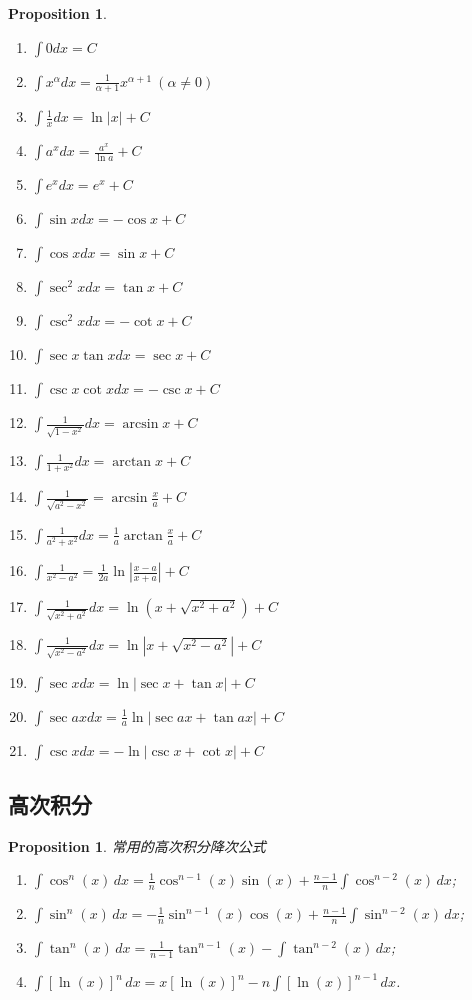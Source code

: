 \documentclass{article}
\newtheorem{proposition}[theorem]{Proposition}
\begin{document}
\begin{proposition}
\rm \
\begin{enumerate}
	\item $\int 0dx = C$
 	\item $\int x^{\alpha}dx = \frac{1}{\alpha+1}x^{\alpha+1}~(\alpha \neq 0)$ 
	\item $\int \frac{1}{x} dx = \ln |x| + C$
	\item $\int a^{x}dx = \frac{a^x}{\ln a} + C$
	\item $\int e^x dx = e^x + C$
	\item $\int \sin x dx = -\cos x + C$
	\item $\int \cos x dx = \sin x + C$
	\item $\int \sec^2 x dx = \tan x +C$
	\item $\int \csc^2 x dx = -\cot x + C$
	\item $\int \sec x\tan x dx = \sec x +C$
	\item $\int \csc x\cot x dx = -\csc x + C$
	\item $\int \frac{1}{\sqrt{1-x^2}}dx = \arcsin x+C$
	\item $\int \frac{1}{1+x^2}dx = \arctan x + C$
	\item $\int \frac{1}{\sqrt{a^2 -x^2}} = \arcsin \frac{x}{a} + C$
	\item $\int \frac{1}{a^2 + x^2}dx = \frac{1}{a}\arctan \frac{x}{a} + C$
	\item $\int \frac{1}{x^2 - a^2} =\frac{1}{2a} \ln \left| \frac{x-a}{x+a}\right|+C$
	\item $\int \frac{1}{\sqrt{x^2 + a^2}}dx = \ln(x+\sqrt{x^2 + a^2})+C$
	\item $\int \frac{1}{\sqrt{x^2 - a^2}}dx = \ln \left| x+ \sqrt{x^2 - a^2}\right|+C$
	\item $\int \sec x dx = \ln |\sec x + \tan x|+C$
	\item $\int \sec ax dx = \frac{1}{a}\ln |\sec ax + \tan ax|+C$
	\item $\int \csc x dx = -\ln|\csc x + \cot x|+C$
\end{enumerate}
\end{proposition}

\subsection{高次积分}

\begin{proposition}
\rm 常用的高次积分降次公式
\begin{enumerate}
	\item $\int \cos ^{n}(x)\,dx={\frac  {1}{n}}\cos ^{{n-1}}(x)\sin(x)+{\frac  {n-1}{n}}\int \cos ^{{n-2}}(x)\,dx$;
	\item $\int \sin ^{n}(x)\,dx=-{\frac  {1}{n}}\sin ^{{n-1}}(x)\cos(x)+{\frac  {n-1}{n}}\int \sin ^{{n-2}}(x)\,dx$;
	\item $\int \tan ^{n}(x)\,dx={\frac  {1}{n-1}}\tan ^{{n-1}}(x)-\int \tan ^{{n-2}}(x)\,dx$;
	\item $\int [\ln(x)]^{n}\,dx=x[\ln(x)]^{n}-n\int [\ln(x)]^{{n-1}}\,dx$.
\end{enumerate}
\end{proposition}
\end{document}
